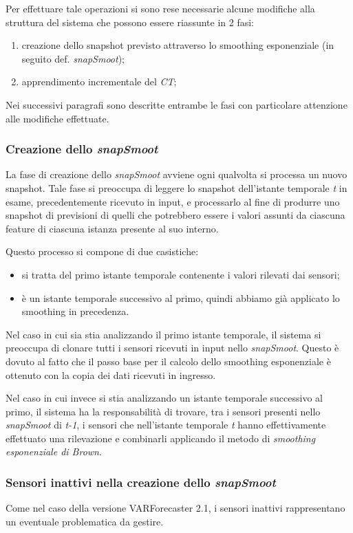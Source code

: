 \documentclass[12pt,a4paper,twoside,openright]{book}
\begin{document}
Per effettuare tale operazioni si sono rese necessarie alcune modifiche alla struttura del sistema che possono essere riassunte in 2 fasi:
\begin{enumerate}
\item creazione dello snapshot previsto attraverso lo smoothing esponenziale (in seguito def. \textit{snapSmoot});
\item apprendimento incrementale del \textit{CT};
\end{enumerate}
Nei successivi paragrafi sono descritte entrambe le fasi con particolare attenzione alle modifiche effettuate.
\subsubsection{Creazione dello \textit{snapSmoot}}
La fase di creazione dello \textit{snapSmoot} avviene ogni qualvolta si processa un nuovo snapshot. Tale fase si preoccupa di leggere lo snapshot dell'istante temporale \textit{t} in esame, precedentemente ricevuto in input, e processarlo al fine di produrre uno snapshot di previsioni di quelli che potrebbero essere i valori assunti da ciascuna feature di ciascuna istanza presente al suo interno. 

Questo processo si compone di due casistiche:
\begin{itemize}
\item si tratta del primo istante temporale contenente i valori rilevati dai sensori;
\item è un istante temporale successivo al primo, quindi abbiamo già applicato lo smoothing in precedenza.
\end{itemize}

Nel caso in cui sia stia analizzando il primo istante temporale, il sistema si preoccupa di clonare tutti i sensori ricevuti in input nello \textit{snapSmoot}. Questo è dovuto al fatto che il passo base per il calcolo dello smoothing esponenziale è ottenuto con la copia dei dati ricevuti in ingresso. 

Nel caso in cui invece si stia analizzando un istante temporale successivo al primo, il sistema ha la responsabilità di trovare, tra i sensori presenti nello \textit{snapSmoot} di \textit{t-1}, i sensori che nell'istante temporale \textit{t} hanno effettivamente effettuato una rilevazione e combinarli applicando il metodo di \textit{smoothing esponenziale di Brown}.

\subsubsection{Sensori inattivi nella creazione dello \textit{snapSmoot}}
Come nel caso della versione VARForecaster 2.1, i sensori inattivi rappresentano un eventuale problematica da gestire. 
\end{document}
